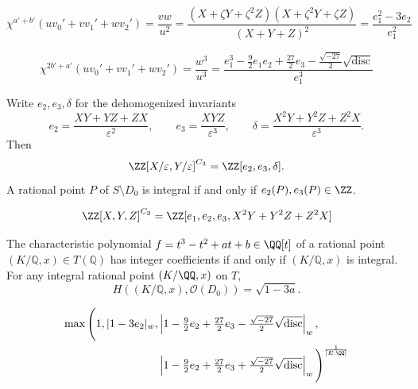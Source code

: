 \begin{equation}\label{eqn:formulaForNormCharacter} \chi^{a'+b'}(uv_0' + vv_1'+wv_2') = \frac{vw}{u^2} = \frac{(X+\zeta Y+\zeta^2 Z)(X+\zeta^2 Y+\zeta Z)}{(X+Y+Z)^2} = \frac{e_1^2-3e_2}{e_1^2} \end{equation}

\begin{equation}\label{eqn:formulaForNormCharacter2} \chi^{2b'+a'}(uv_0' + vv_1'+wv_2') =\frac{w^3}{u^3} = \frac{e_1^3-\tfrac 92 e_1 e_2+ \tfrac{27}{2} e_3 - \tfrac{\sqrt{-27}}{2} \sqrt{\mathrm{disc}}}{e_1^3} \end{equation}

\begin{lemma}\label{lemma:affineIntegrality} Write $e_2,e_3,\delta$ for the dehomogenized invariants \[ e_2=\frac{XY+YZ+ZX}{\varepsilon^2},\qquad e_3=\frac{XYZ}{\varepsilon^3},\qquad \delta=\frac{X^2Y+Y^2Z+Z^2X}{\varepsilon^3}. \] Then \begin{equation}\label{eqn:affineC3invariants} \ZZ[X/\varepsilon,Y/\varepsilon]^{C_3} =\ZZ[e_2,e_3,\delta]. \end{equation} A rational point $P$ of $S\setminus D_0$ is integral if and only if $e_2(P),e_3(P)\in\ZZ$. \end{lemma}

\begin{equation}\label{eqn:C3invariants} \ZZ[X,Y,Z]^{C_3} =\ZZ[e_1,e_2,e_3,X^2Y+Y^2Z+Z^2X] \end{equation}

\begin{proposition}\label{prop:canonicalHeight} The characteristic polynomial $f = t^3-t^2+at+b \in \QQ[t]$ of a rational point $(K/\mathbb Q,x) \in T(\mathbb Q)$ has integer coefficients if and only if $(K/\mathbb Q,x)$ is integral. For any integral rational point $(K/\QQ,x)$ on $T$, \begin{equation} H((K/\mathbb Q,x),\mathcal O(D_0)) = \sqrt{1-3a}. \end{equation} \end{proposition}

\begin{align}\label{eqn:localHeight} \max\Bigg( 1, |1-3e_2|_w, &\left| 1-\tfrac{9}{2} e_2+ \tfrac{27}{2} e_3 - \tfrac{\sqrt{-27}}{2} \sqrt{\mathrm{disc}} \right|_w, \\ &\left| 1-\tfrac{9}{2} e_2+ \tfrac{27}{2} e_3 + \tfrac{\sqrt{-27}}{2} \sqrt{\mathrm{disc}} \right|_w \Bigg)^{\frac{1}{[E:\QQ]}} \end{align}

